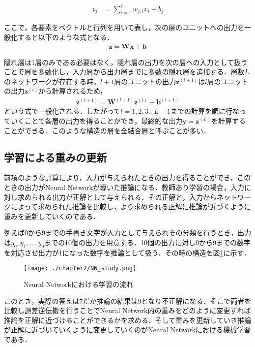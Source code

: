 \begin{align}
z_{j} &= \sum^{I}_{i=1}w_{j,i}x_{i} + b_j
\end{align}

ここで，各要素をベクトルと行列を用いて表し，次の層のユニットへの出力を一般化すると以下のような式となる．
\begin{align}
\bm{z} = \bm{W}\bm{x} + \bm{b}
\end{align}

隠れ層は1層のみである必要はなく，隠れ層の出力を次の層への入力として扱うことで層を多数化し，入力層から出力層までに多数の隠れ層を追加する．層数$L$のネットワークが存在する時，$l+1$層のユニットの出力$\bm{z}^{(l+1)}$は$l$層のユニットの出力$\bm{z}^{(l)}$から計算されるため，
\begin{align}
\bm{z}^{(l+1)} = \bm{W}^{(l+1)}\bm{z}^{(l)} + \bm{b}^{(l+1)}
\end{align}
という式で一般化される．したがって$l=1,2,3\ldots L-1$までの計算を順に行なっていくことで各層の出力を得ることができ，最終的な出力$\bm{y}=\bm{z}^{(L)}$を計算することができる．このような構造の層を全結合層と呼ぶことが多い．


\subsection{学習による重みの更新}
前項のような計算により，入力が与えられたときの出力を得ることができ，このときの出力がNeural Networkが導いた推論になる．教師あり学習の場合，入力に対し求められる出力が正解として与えられる．その正解と，入力からネットワークによって求められた推論を比較し，より求められる正解に推論が近づくように重みを更新していくのである．

例えば0から9までの手書き文字が入力として与えられその分類を行うとき，出力は$y_0, y_1, \ldots , y_9$までの10個の出力を用意する．10個の出力に対し0から9までの数字を対応させ出力が1になった数字を推論として扱う．その時の構造を図\ref{fig_study}に示す．
\begin{figure}[htbp]
  \begin{center}
    \texttt{[image: ./chapter2/NN\_study.png]}
    \caption{Neural Networkにおける学習の流れ}
    \label{fig_study}
  \end{center}
\end{figure}

このとき，実際の答えは7だが推論の結果は9となり不正解になる．そこで両者を比較し誤差逆伝搬を行うことでNeural Network内の重みをどのように変更すれば推論を正解に近づけることができるかを求める．そして重みを更新していき推論が正解に近づいていくように変更していくのがNeural Networkにおける機械学習である\cite{book_tex}．

